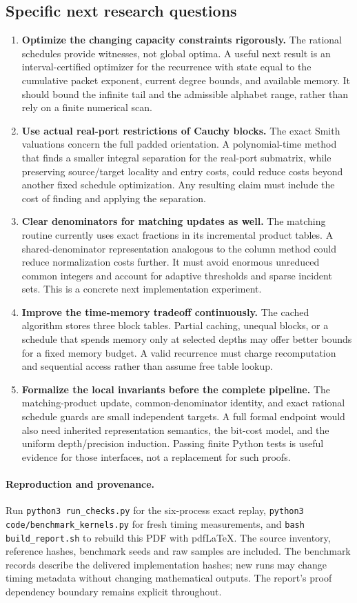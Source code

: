 \subsection{Specific next research questions}
\begin{enumerate}
\item \textbf{Optimize the changing capacity constraints rigorously.}
The rational schedules provide witnesses, not global optima. A useful next
result is an interval-certified optimizer for the recurrence with state equal
to the cumulative packet exponent, current degree bounds, and available
memory. It should bound the infinite tail and the admissible alphabet range,
rather than rely on a finite numerical scan.
\item \textbf{Use actual real-port restrictions of Cauchy blocks.}
The exact Smith valuations concern the full padded orientation. A
polynomial-time method that finds a smaller integral separation for the
real-port submatrix, while preserving source/target locality and entry costs,
could reduce costs beyond another fixed schedule optimization. Any resulting
claim must include the cost of finding and applying the separation.
\item \textbf{Clear denominators for matching updates as well.}
The matching routine currently uses exact fractions in its incremental
product tables. A shared-denominator representation analogous to the column
method could reduce normalization costs further. It must avoid enormous
unreduced common integers and account for adaptive thresholds and sparse
incident sets. This is a concrete next implementation experiment.
\item \textbf{Improve the time-memory tradeoff continuously.}
The cached algorithm stores three block tables. Partial caching, unequal
blocks, or a schedule that spends memory only at selected depths may offer
better bounds for a fixed memory budget. A valid recurrence must charge
recomputation and sequential access rather than assume free table lookup.
\item \textbf{Formalize the local invariants before the complete pipeline.}
The matching-product update, common-denominator identity, and exact rational
schedule guards are small independent targets. A full formal endpoint would
also need inherited representation semantics, the bit-cost model, and the
uniform depth/precision induction. Passing finite Python tests is useful
evidence for those interfaces, not a replacement for such proofs.
\end{enumerate}

\paragraph{Reproduction and provenance.}
Run \texttt{python3 run\_checks.py} for the six-process exact replay,
\texttt{python3 code/benchmark\_kernels.py} for fresh timing measurements,
and \texttt{bash build\_report.sh} to rebuild this PDF with pdf\LaTeX.
The source inventory, reference hashes, benchmark seeds and raw samples are
included. The benchmark records describe the delivered implementation hashes;
new runs may change timing metadata without changing mathematical outputs.
The report's proof dependency boundary remains explicit throughout.
